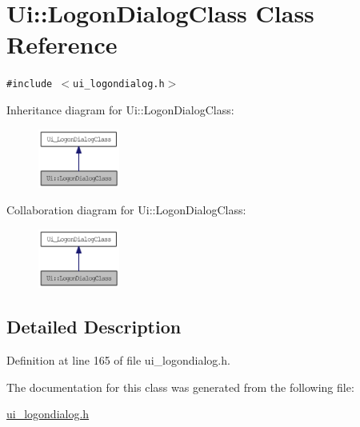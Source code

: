 \hypertarget{class_ui_1_1_logon_dialog_class}{
\section{Ui::LogonDialogClass Class Reference}
\label{class_ui_1_1_logon_dialog_class}
}
{\tt \#include $<$ui\_\-logondialog.h$>$}

Inheritance diagram for Ui::LogonDialogClass:\nopagebreak
\begin{figure}[H]
\begin{center}
\leavevmode
\includegraphics[width=76pt]{class_ui_1_1_logon_dialog_class__inherit__graph}
\end{center}
\end{figure}
Collaboration diagram for Ui::LogonDialogClass:\nopagebreak
\begin{figure}[H]
\begin{center}
\leavevmode
\includegraphics[width=76pt]{class_ui_1_1_logon_dialog_class__coll__graph}
\end{center}
\end{figure}


\subsection{Detailed Description}


Definition at line 165 of file ui\_\-logondialog.h.

The documentation for this class was generated from the following file:\begin{CompactItemize}
\item 
\hyperlink{ui__logondialog_8h}{ui\_\-logondialog.h}\end{CompactItemize}
